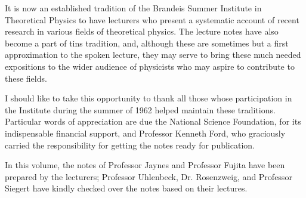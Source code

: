\documentclass[]{article}
\begin{document}
It is now an established tradition of the Brandeis Summer Institute in
Theoretical Physics to have lecturers who present a systematic account
of recent research in various fields of theoretical physics. The lecture
notes have also become a part of tins tradition, and, although these are
sometimes but a first approximation to the spoken lecture, they may
serve to bring these much needed expositions to the wider audience of
physicists who may aspire to contribute to these fields.

I should like to take this opportunity to thank all those whose
participation in the Institute during the summer of 1962 helped maintain
these traditions. Particular words of appreciation are due the National
Science Foundation, for its indispensable financial support, and
Professor Kenneth Ford, who graciously carried the responsibility for
getting the notes ready for publication.

In this volume, the notes of Professor Jaynes and Professor Fujita have
been prepared by the lecturers; Professor Uhlenbeck, Dr. Rosenzweig, and
Professor Siegert have kindly checked over the notes based on their
lectures.
\end{document}
